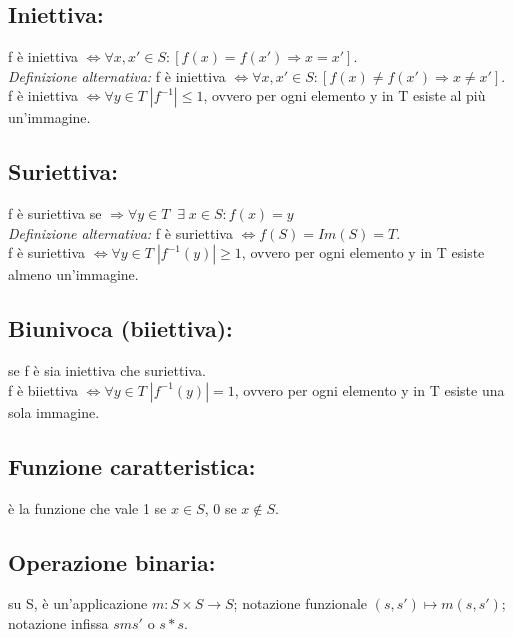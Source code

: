 \subsection{Iniettiva:} f è iniettiva \(\Leftrightarrow \forall x, x' \in S :[f(x)=f(x')\Rightarrow x=x']\).
\\\textit{Definizione alternativa:} f è iniettiva \(\Leftrightarrow \forall x,x' \in S : [f(x)\neq f(x') \Rightarrow x\neq x']\).
\\
f è iniettiva \(\Leftrightarrow \forall y \in T \; |f^{-1}|\leq 1\), ovvero per ogni elemento y in T esiste al più un'immagine.

\subsection{Suriettiva:} f è suriettiva se \(\Rightarrow \forall y\in T \;\;\exists\; x \in S : f(x)=y\)
\\
\textit{Definizione alternativa:} f è suriettiva \(\Leftrightarrow f(S) = Im(S) = T\).
\\
f è suriettiva \(\Leftrightarrow \forall y \in T \; |f^{-1}(y)|\geq 1\), ovvero per ogni elemento y in T esiste almeno un'immagine.

\subsection{Biunivoca (biiettiva):} se f è sia iniettiva che suriettiva.
\\
f è biiettiva \(\Leftrightarrow \forall y \in T \; |f^{-1}(y)|=1\), ovvero per ogni elemento y in T esiste una sola immagine.

\subsection{Funzione caratteristica:} è la funzione che vale 1 se \(x \in S\), 0 se \(x \notin S\).

\subsection{Operazione binaria:} su S, è un'applicazione \(m:S\times S \rightarrow S\); notazione funzionale \((s, s') \mapsto m(s, s')\); notazione infissa \(sms'\) o \(s*s\).

